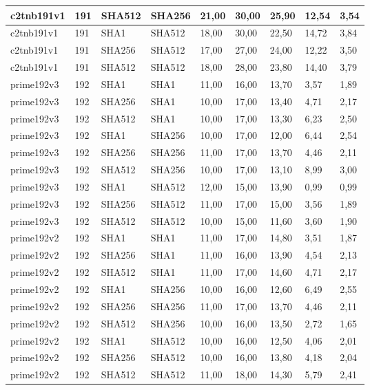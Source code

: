 \begin{longtable}{| l | l | l | l | l |l |l |l |l |}
c2tnb191v1 & 191 & SHA512 & SHA256 & 21,00 & 30,00 & 25,90 & 12,54 & 3,54 \\ \hline 
c2tnb191v1 & 191 & SHA1 & SHA512 & 18,00 & 30,00 & 22,50 & 14,72 & 3,84 \\ \hline 
c2tnb191v1 & 191 & SHA256 & SHA512 & 17,00 & 27,00 & 24,00 & 12,22 & 3,50 \\ \hline 
c2tnb191v1 & 191 & SHA512 & SHA512 & 18,00 & 28,00 & 23,80 & 14,40 & 3,79 \\ \hline 
prime192v3 & 192 & SHA1 & SHA1 & 11,00 & 16,00 & 13,70 & 3,57 & 1,89 \\ \hline 
prime192v3 & 192 & SHA256 & SHA1 & 10,00 & 17,00 & 13,40 & 4,71 & 2,17 \\ \hline 
prime192v3 & 192 & SHA512 & SHA1 & 10,00 & 17,00 & 13,30 & 6,23 & 2,50 \\ \hline 
prime192v3 & 192 & SHA1 & SHA256 & 10,00 & 17,00 & 12,00 & 6,44 & 2,54 \\ \hline 
prime192v3 & 192 & SHA256 & SHA256 & 11,00 & 17,00 & 13,70 & 4,46 & 2,11 \\ \hline 
prime192v3 & 192 & SHA512 & SHA256 & 10,00 & 17,00 & 13,10 & 8,99 & 3,00 \\ \hline 
prime192v3 & 192 & SHA1 & SHA512 & 12,00 & 15,00 & 13,90 & 0,99 & 0,99 \\ \hline 
prime192v3 & 192 & SHA256 & SHA512 & 11,00 & 17,00 & 15,00 & 3,56 & 1,89 \\ \hline 
prime192v3 & 192 & SHA512 & SHA512 & 10,00 & 15,00 & 11,60 & 3,60 & 1,90 \\ \hline 
prime192v2 & 192 & SHA1 & SHA1 & 11,00 & 17,00 & 14,80 & 3,51 & 1,87 \\ \hline 
prime192v2 & 192 & SHA256 & SHA1 & 11,00 & 16,00 & 13,90 & 4,54 & 2,13 \\ \hline 
prime192v2 & 192 & SHA512 & SHA1 & 11,00 & 17,00 & 14,60 & 4,71 & 2,17 \\ \hline 
prime192v2 & 192 & SHA1 & SHA256 & 10,00 & 16,00 & 12,60 & 6,49 & 2,55 \\ \hline 
prime192v2 & 192 & SHA256 & SHA256 & 11,00 & 17,00 & 13,70 & 4,46 & 2,11 \\ \hline 
prime192v2 & 192 & SHA512 & SHA256 & 10,00 & 16,00 & 13,50 & 2,72 & 1,65 \\ \hline 
prime192v2 & 192 & SHA1 & SHA512 & 10,00 & 16,00 & 12,50 & 4,06 & 2,01 \\ \hline 
prime192v2 & 192 & SHA256 & SHA512 & 10,00 & 16,00 & 13,80 & 4,18 & 2,04 \\ \hline 
prime192v2 & 192 & SHA512 & SHA512 & 11,00 & 18,00 & 14,30 & 5,79 & 2,41 \\ \hline 

\end{longtable}
